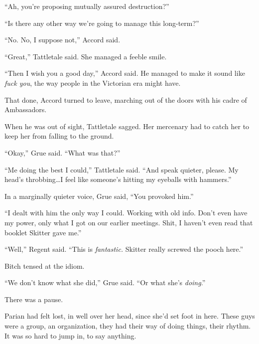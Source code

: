 ``Ah, you're proposing mutually assured destruction?''



``Is there any other way we're going to manage this long-term?''



``No.  No, I suppose not,'' Accord said.



``Great,'' Tattletale said.  She managed a feeble smile.



``Then I wish you a good day,'' Accord said.  He managed to make it sound like \emph{fuck you}, the way people in the Victorian era might have.



That done, Accord turned to leave, marching out of the doors with his cadre of Ambassadors.



When he was out of sight, Tattletale sagged.  Her mercenary had to catch her to keep her from falling to the ground.



``Okay,'' Grue said.  ``What was that?''



``Me doing the best I could,'' Tattletale said.  ``And speak quieter, please.  My head's throbbing\ldots I feel like someone's hitting my eyeballs with hammers.''



In a marginally quieter voice, Grue said, ``You provoked him.''



``I dealt with him the only way I could.  Working with old info.  Don't even have my power, only what I got on our earlier meetings.  Shit, I haven't even read that booklet Skitter gave me.''



``Well,'' Regent said.  ``This is \emph{fantastic.  }Skitter really screwed the pooch here.''



Bitch tensed at the idiom.



``We don't know what she did,'' Grue said.  ``Or what she's \emph{doing}.''



There was a pause.



Parian had felt lost, in well over her head, since she'd set foot in here.  These guys were a group, an organization, they had their way of doing things, their rhythm.  It was so hard to jump in, to say anything.



